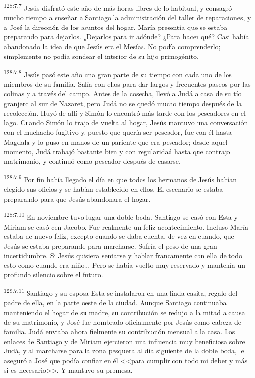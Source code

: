 \par 
\textsuperscript{128:7.7} Jesús disfrutó este año de más horas libres de lo habitual, y consagró mucho tiempo a enseñar a Santiago la administración del taller de reparaciones, y a José la dirección de los asuntos del hogar. María presentía que se estaba preparando para dejarlos. ¿Dejarlos para ir adónde? ¿Para hacer qué? Casi había abandonado la idea de que Jesús era el Mesías. No podía comprenderlo; simplemente no podía sondear el interior de su hijo primogénito.

\par 
\textsuperscript{128:7.8} Jesús pasó este año una gran parte de su tiempo con cada uno de los miembros de su familia. Salía con ellos para dar largos y frecuentes paseos por las colinas y a través del campo. Antes de la cosecha, llevó a Judá a casa de su tío granjero al sur de Nazaret, pero Judá no se quedó mucho tiempo después de la recolección. Huyó de allí y Simón lo encontró más tarde con los pescadores en el lago. Cuando Simón lo trajo de vuelta al hogar, Jesús mantuvo una conversación con el muchacho fugitivo y, puesto que quería ser pescador, fue con él hasta Magdala y lo puso en manos de un pariente que era pescador; desde aquel momento, Judá trabajó bastante bien y con regularidad hasta que contrajo matrimonio, y continuó como pescador después de casarse.

\par 
\textsuperscript{128:7.9} Por fin había llegado el día en que todos los hermanos de Jesús habían elegido sus oficios y se habían establecido en ellos. El escenario se estaba preparando para que Jesús abandonara el hogar.

\par 
\textsuperscript{128:7.10} En noviembre tuvo lugar una doble boda. Santiago se casó con Esta y Miriam se casó con Jacobo. Fue realmente un feliz acontecimiento. Incluso María estaba de nuevo feliz, excepto cuando se daba cuenta, de vez en cuando, que Jesús se estaba preparando para marcharse. Sufría el peso de una gran incertidumbre. Si Jesús quisiera sentarse y hablar francamente con ella de todo esto como cuando era niño... Pero se había vuelto muy reservado y mantenía un profundo silencio sobre el futuro.

\par 
\textsuperscript{128:7.11} Santiago y su esposa Esta se instalaron en una linda casita, regalo del padre de ella, en la parte oeste de la ciudad. Aunque Santiago continuaba manteniendo el hogar de su madre, su contribución se redujo a la mitad a causa de su matrimonio, y José fue nombrado oficialmente por Jesús como cabeza de familia. Judá enviaba ahora fielmente su contribución mensual a la casa. Los enlaces de Santiago y de Miriam ejercieron una influencia muy beneficiosa sobre Judá, y al marcharse para la zona pesquera al día siguiente de la doble boda, le aseguró a José que podía confiar en él <<para cumplir con todo mi deber y más si es necesario>>. Y mantuvo su promesa.


